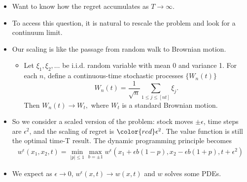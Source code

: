 \documentclass{beamer}
\begin{document}
\begin{frame}
\begin{itemize}
\item Want to know how the regret accumulates as $T\to \infty$.
\pause
\item To access this question, it is natural to rescale the problem and look for a continuum limit.
\pause
\item Our scaling is like the passage from random walk to Brownian motion.
 \begin{itemize}
 \item Let $\xi_1,\xi_2,\ldots$ be i.i.d. random variable with mean 0 and variance 1. For each $n$, define a continuous-time stochastic processes $\{W_n(t)\}$
 $$W_n(t) = \frac{1}{\sqrt{n}}\sum_{1\le j\le [nt]}\xi_j.$$ 
Then $W_n(t)\to W_t,$ where $W_t$ is a standard Brownian motion.
\centering
{}
\end{itemize}

\end{itemize}

\end{frame}

\begin{frame}
\begin{itemize}
\item So we consider a {\color{red}scaled} version of the problem: stock moves {\color{red}$\pm \epsilon$}, time steps are {\color{red}$ \epsilon^2$}, and the scaling of regret is ${\color{red}\epsilon^2}$. The value function is still the optimal time-T result.  The dynamic programming principle becomes
\begin{align*}
w^\epsilon(x_1,x_2,t) = \min_{|p|\le 1}\max_{b = \pm 1} w^\epsilon(x_1 + \epsilon b(1-p),x_2-\epsilon b(1+p),t+\epsilon^2)
\end{align*}
\pause
\item We expect as $\epsilon\to 0$, $w^\epsilon(x,t)\to w(x,t)$ and $w$ solves some PDEs.
\end{itemize}

\end{frame}
\end{document}
